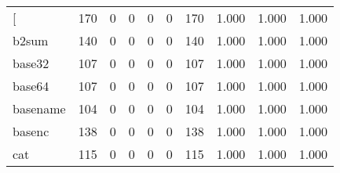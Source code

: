 \begin{longtable}{lp{2.0cm}p{2.0cm}p{2.0cm}p{2.0cm}p{2.0cm}p{2.0cm}p{2.0cm}p{2.0cm}p{2.0cm}}
\bottomrule
\endlastfoot
{[}         &                    170 &                                  0 &                                 0 &                                0 &                                 0 &                             170 &                                1.000 &                                  1.000 &                                1.000 \\
b2sum     &                    140 &                                  0 &                                 0 &                                0 &                                 0 &                             140 &                                1.000 &                                  1.000 &                                1.000 \\
base32    &                    107 &                                  0 &                                 0 &                                0 &                                 0 &                             107 &                                1.000 &                                  1.000 &                                1.000 \\
base64    &                    107 &                                  0 &                                 0 &                                0 &                                 0 &                             107 &                                1.000 &                                  1.000 &                                1.000 \\
basename  &                    104 &                                  0 &                                 0 &                                0 &                                 0 &                             104 &                                1.000 &                                  1.000 &                                1.000 \\
basenc    &                    138 &                                  0 &                                 0 &                                0 &                                 0 &                             138 &                                1.000 &                                  1.000 &                                1.000 \\
cat       &                    115 &                                  0 &                                 0 &                                0 &                                 0 &                             115 &                                1.000 &                                  1.000 &                                1.000 \\

\end{longtable}
